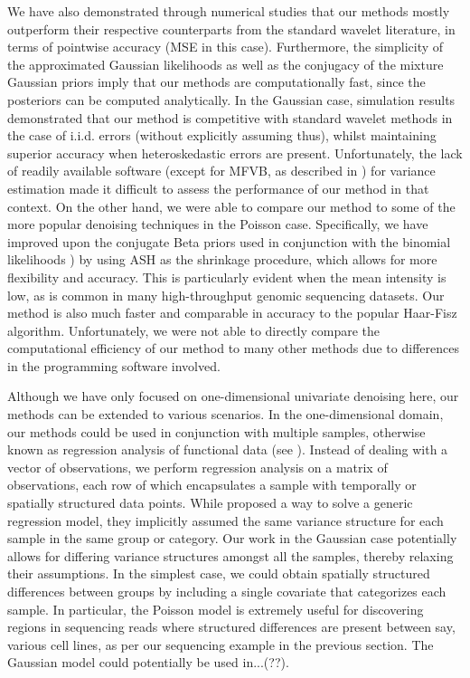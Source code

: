 \documentclass[12pt]{article}
\begin{document}
We have also demonstrated through numerical studies that our methods mostly outperform their respective counterparts from the standard wavelet literature, in terms of pointwise accuracy (MSE in this case). Furthermore, the simplicity of the approximated Gaussian likelihoods as well as the conjugacy of the mixture Gaussian priors imply that our methods are computationally fast, since the posteriors can be computed analytically. In the Gaussian case, simulation results demonstrated that our method is competitive with standard wavelet methods in the case of i.i.d. errors (without explicitly assuming thus), whilst maintaining superior accuracy when heteroskedastic errors are present. Unfortunately, the lack of readily available software (except for MFVB, as described in \cite{Menictas2015Variational}) for variance estimation made it difficult to assess the performance of our method in that context. On the other hand, we were able to compare our method to some of the more popular denoising techniques in the Poisson case. Specifically, we have improved upon the conjugate Beta priors used in conjunction with the binomial likelihoods \cite{Kolaczyk1999Bayesian}) by using ASH as the shrinkage procedure, which allows for more flexibility and accuracy. This is particularly evident when the mean intensity is low, as is common in many high-throughput genomic sequencing datasets. Our method is also much faster and comparable in accuracy to the popular Haar-Fisz algorithm. Unfortunately, we were not able to directly compare the computational efficiency of our method to many other methods due to differences in the programming software involved.

Although we have only focused on one-dimensional univariate denoising here, our methods can be extended to various scenarios. In the one-dimensional domain, our methods could be used in conjunction with multiple samples, otherwise known as regression analysis of functional data (see \cite{Morris2006Waveletbased}). Instead of dealing with a vector of observations, we perform regression analysis on a matrix of observations, each row of which encapsulates a sample with temporally or spatially structured data points. While \cite{Morris2006Waveletbased} proposed a way to solve a generic regression model, they implicitly assumed the same variance structure for each sample in the same group or category. Our work in the Gaussian case potentially allows for differing variance structures amongst all the samples, thereby relaxing their assumptions. In the simplest case, we could obtain spatially structured differences between groups by including a single covariate that categorizes each sample. In particular, the Poisson model is extremely useful for discovering regions in sequencing reads where structured differences are present between say, various cell lines, as per our sequencing example in the previous section. The Gaussian model could potentially be used in...(??).
\end{document}

